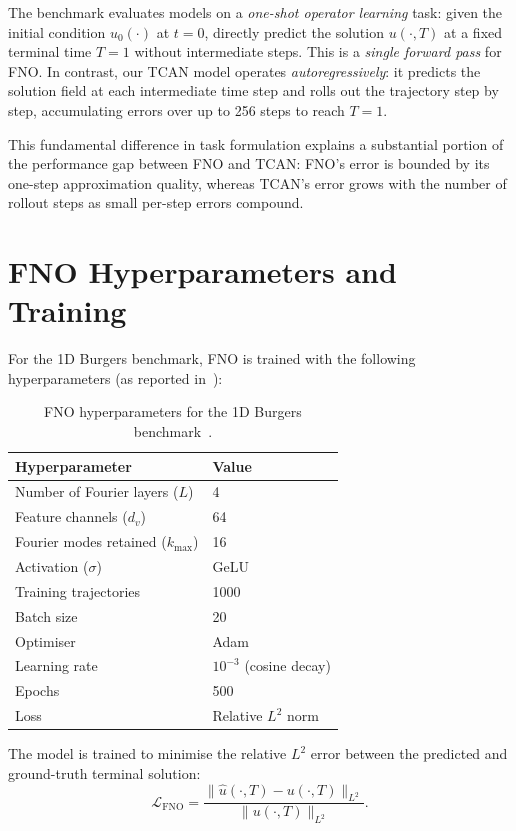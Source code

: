 The benchmark evaluates models on a \emph{one-shot operator learning} task: given the initial condition $u_0(\cdot)$ at $t=0$, directly predict the solution $u(\cdot, T)$ at a fixed terminal time $T=1$ without intermediate steps. This is a \emph{single forward pass} for FNO. In contrast, our TCAN model operates \emph{autoregressively}: it predicts the solution field at each intermediate time step and rolls out the trajectory step by step, accumulating errors over up to 256 steps to reach $T=1$.

This fundamental difference in task formulation explains a substantial portion of the performance gap between FNO and TCAN: FNO's error is bounded by its one-step approximation quality, whereas TCAN's error grows with the number of rollout steps as small per-step errors compound.

\section{FNO Hyperparameters and Training}
\label{sec:fno:training}

For the 1D Burgers benchmark, FNO is trained with the following hyperparameters (as reported in~\cite{li2021fourier}):

\begin{table}[h!]
\centering
\begin{tabular}{ll}
\toprule
\textbf{Hyperparameter} & \textbf{Value} \\
\midrule
Number of Fourier layers ($L$) & 4 \\
Feature channels ($d_v$) & 64 \\
Fourier modes retained ($k_{\max}$) & 16 \\
Activation ($\sigma$) & GeLU \\
Training trajectories & 1000 \\
Batch size & 20 \\
Optimiser & Adam \\
Learning rate & $10^{-3}$ (cosine decay) \\
Epochs & 500 \\
Loss & Relative $L^2$ norm \\
\bottomrule
\end{tabular}
\caption{FNO hyperparameters for the 1D Burgers benchmark~\cite{li2021fourier}.}
\label{tab:fno-hyperparams}
\end{table}

The model is trained to minimise the relative $L^2$ error between the predicted and ground-truth terminal solution:
\begin{equation}
  \mathcal{L}_{\mathrm{FNO}} = \frac{\|\hat{u}(\cdot,T) - u(\cdot,T)\|_{L^2}}{\|u(\cdot,T)\|_{L^2}}.
\end{equation}


